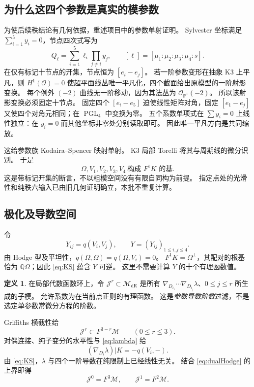\documentclass[11pt,a4paper]{ctexart}
\theoremstyle{cnplain}
\theoremstyle{definition}
\newtheorem{definition}[theorem]{定义}
\theoremstyle{remark}
\newcommand{\Q}{\mathbb Q}
\newcommand{\dR}{\mathrm{dR}}
\newcommand{\cM}{\mathcal M}
\begin{document}
\subsection{为什么这四个参数是真实的模参数}
为使后续秩结论有几何依据，重述项目中的参数单射证明。
Sylvester 坐标满足 $\sum_{i=1}^5y_i=0$，节点四次式写为
\begin{equation}\label{eq:Sylvester}
 Q_\ell=\sum_{i=1}^5\ell_i\prod_{j\ne i}y_j,
 \qquad [\ell]=[\mu_1:\mu_2:\mu_3:\mu_4:s].
\end{equation}
在仅有标记十节点的开集，节点恒为 $[e_i-e_j]$。
若一阶参数变形在抽象 K3 上平凡，则 $H^1(\mathcal O)=0$ 使超平面线丛唯一平凡化，四个截面给出原模型的一阶射影变换。
每个例外 $(-2)$ 曲线无一阶移动，因为其法丛为 $\mathcal O_{\mathbb P^1}(-2)$。
所以该射影变换必须固定十节点。
固定四个 $[e_i-e_5]$ 迫使线性矩阵对角，固定 $[e_1-e_j]$ 又使四个对角元相同；在 $\operatorname{PGL}_4$ 中变换为零。
五个系数单项式在 $\sum y_i=0$ 上线性独立：在 $y_i=0$ 而其他坐标非零处分别读取即可。
因此唯一平凡方向是共同缩放。

这给参数族 Kodaira--Spencer 映射单射。
K3 局部 Torelli 将其与周期线的微分识别\cite[Chapter 6, Proposition 2.8]{huy}。
于是
\begin{equation}\label{eq:KS}
 \Omega,V_1,V_2,V_3,V_4\ \text{构成 }F^1K\text{ 的基}.
\end{equation}
这是带标记开集的断言，不以粗模空间没有有限自同构为前提。
指定点处的光滑性和纯秩六输入已由旧几何证明确立，本批不重复计算。

\subsection{极化及导数空间}
令
\begin{equation}\label{eq:Y}
 Y_{ij}=q(V_i,V_j),\qquad Y=(Y_{ij})_{1\le i,j\le4}.
\end{equation}
由 Hodge 型及平坦性，$q(\Omega,\Omega)=q(\Omega,V_i)=0$。
$F^1K=\Omega^\perp$，其配对的根基恰为 $\Q\Omega$；因此 \eqref{eq:KS} 蕴含 $Y$ 可逆。
这里不需要计算 $Y$ 的十个有理函数值。

\begin{definition}
在局部代数函数环上，令 $\mathcal J^r\subset\cM_{\dR}$ 是所有
$\nabla_{D_{i_1}}\cdots\nabla_{D_{i_j}}\lambda$、$0\le j\le r$ 所生成的子模。
允许系数为在当前点正则的有理函数。
这是\emph{参数导数阶数}过滤，不是选定单参数常微分方程的阶数。
\end{definition}

Griffiths 横截性给
\begin{equation}\label{eq:upper}
 \mathcal J^r\subset F^{3-r}\cM\qquad(0\le r\le3).
\end{equation}
对偶连接、纯子变分的水平性与 \eqref{eq:lambda} 给
\begin{equation}\label{eq:first}
 (\nabla_{D_i}\lambda)|K=-q(V_i,-).
\end{equation}
由 \eqref{eq:KS}，$\lambda$ 与四个一阶导数在纯限制上已经线性无关。
结合 \eqref{eq:dualHodge} 的上界即得
\begin{equation}\label{eq:jet1}
 \mathcal J^0=F^3\cM,\qquad\mathcal J^1=F^2\cM.
\end{equation}
\end{document}
